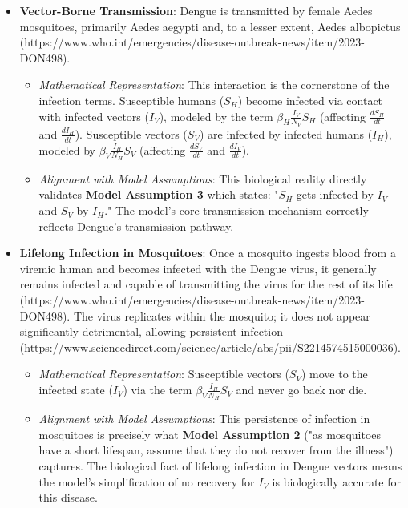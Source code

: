 \begin{itemize}
    \item \textbf{Vector-Borne Transmission}: Dengue is transmitted by female Aedes mosquitoes, primarily Aedes aegypti and, to a lesser extent, Aedes albopictus (https://www.who.int/emergencies/disease-outbreak-news/item/2023-DON498).
    \begin{itemize}
        \item \textit{Mathematical Representation}: This interaction is the cornerstone of the infection terms. Susceptible humans ($S_H$) become infected via contact with infected vectors ($I_V$), modeled by the term $\beta_H \frac{I_V}{N_V} S_H$ (affecting $\frac{dS_H}{dt}$ and $\frac{dI_H}{dt}$). Susceptible vectors ($S_V$) are infected by infected humans ($I_H$), modeled by $\beta_V \frac{I_H}{N_H} S_V$ (affecting $\frac{dS_V}{dt}$ and $\frac{dI_V}{dt}$).
        \item \textit{Alignment with Model Assumptions}: This biological reality directly validates \textbf{Model Assumption 3} which states: "$S_H$ gets infected by $I_V$ and $S_V$ by $I_H$." The model's core transmission mechanism correctly reflects Dengue's transmission pathway.
    \end{itemize}

    \item \textbf{Lifelong Infection in Mosquitoes}: Once a mosquito ingests blood from a viremic human and becomes infected with the Dengue virus, it generally remains infected and capable of transmitting the virus for the rest of its life (https://www.who.int/emergencies/disease-outbreak-news/item/2023-DON498). The virus replicates within the mosquito; it does not appear significantly detrimental, allowing persistent infection (https://www.sciencedirect.com/science/article/abs/pii/S2214574515000036).
    \begin{itemize}
        \item \textit{Mathematical Representation}: Susceptible vectors ($S_V$) move to the infected state ($I_V$) via the term $\beta_V \frac{I_H}{N_H} S_V$ and never go back nor die. 
        \item \textit{Alignment with Model Assumptions}: This persistence of infection in mosquitoes is precisely what \textbf{Model Assumption 2} ("as mosquitoes have a short lifespan, assume that they do not recover from the illness") captures. The biological fact of lifelong infection in Dengue vectors means the model's simplification of no recovery for $I_V$ is biologically accurate for this disease.
    \end{itemize}


\end{itemize}
